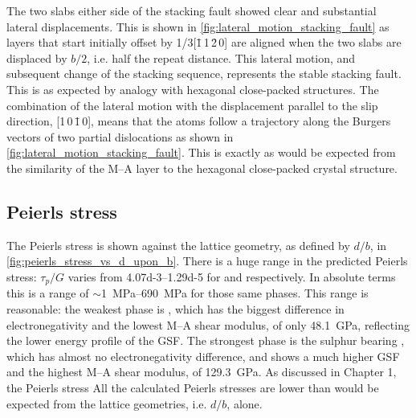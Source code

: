 The two slabs either side of the stacking fault showed clear and substantial lateral displacements. This is shown in \autoref{fig:lateral_motion_stacking_fault} as layers that start initially offset by 1/3[\={1}\,1\,\=2\,0] are aligned when the two slabs are displaced by $b/2$, i.e. half the repeat distance. This lateral motion, and subsequent change of the stacking sequence, represents the stable stacking fault. This is as expected by analogy with hexagonal close-packed structures. The combination of the lateral motion with the displacement parallel to the slip direction, [1\,0\,\={1}\,0], means that the atoms follow a trajectory along the Burgers vectors of two partial dislocations as shown in \autoref{fig:lateral_motion_stacking_fault}. This is exactly as would be expected from the similarity of the M--A layer to the hexagonal close-packed crystal structure. 


\subsection{Peierls stress}

The Peierls stress is shown against the lattice geometry, as defined by $d/b$, in \autoref{fig:peierls_stress_vs_d_upon_b}. There is a huge range in the predicted Peierls stress: $\tau_p / G$ varies from \numrange{4.07d-3}{1.29d-5} for  and  respectively. In absolute terms this is a range of $\sim$\SIrange{1}{690}{\mega\pascal} for those same phases. This range is reasonable: the weakest phase is , which has the biggest difference in electronegativity and the lowest M--A shear modulus, of only \SI{48.1}{\giga\pascal}, reflecting the lower energy profile of the GSF. The strongest phase is the sulphur bearing , which has almost no electronegativity difference, and shows a much higher GSF and the highest M--A shear modulus, of \SI{129.3}{\giga\pascal}. As discussed in Chapter 1, the Peierls stress
All the calculated Peierls stresses are lower than would be expected from the lattice geometries, i.e. $d/b$, alone.



